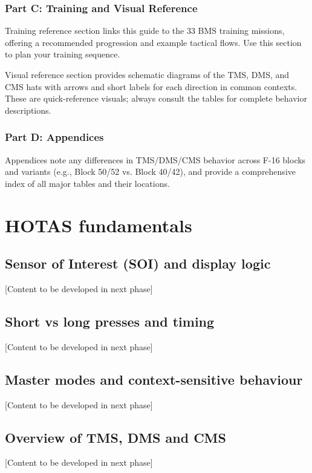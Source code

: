 \documentclass[11pt,a4paper]{article}
\begin{document}
\subsubsection{Part C: Training and Visual Reference}

Training reference section links this guide to the 33 BMS training missions, offering a recommended progression and example tactical flows. Use this section to plan your training sequence.

Visual reference section provides schematic diagrams of the TMS, DMS, and CMS hats with arrows and short labels for each direction in common contexts. These are quick-reference visuals; always consult the tables for complete behavior descriptions.

\subsubsection{Part D: Appendices}

Appendices note any differences in TMS/DMS/CMS behavior across F-16 blocks and variants (e.g., Block 50/52 vs. Block 40/42), and provide a comprehensive index of all major tables and their locations.

\section{HOTAS fundamentals}

\subsection{Sensor of Interest (SOI) and display logic}
[Content to be developed in next phase]

\subsection{Short vs long presses and timing}
[Content to be developed in next phase]

\subsection{Master modes and context-sensitive behaviour}
[Content to be developed in next phase]

\subsection{Overview of TMS, DMS and CMS}
[Content to be developed in next phase]
\end{document}
